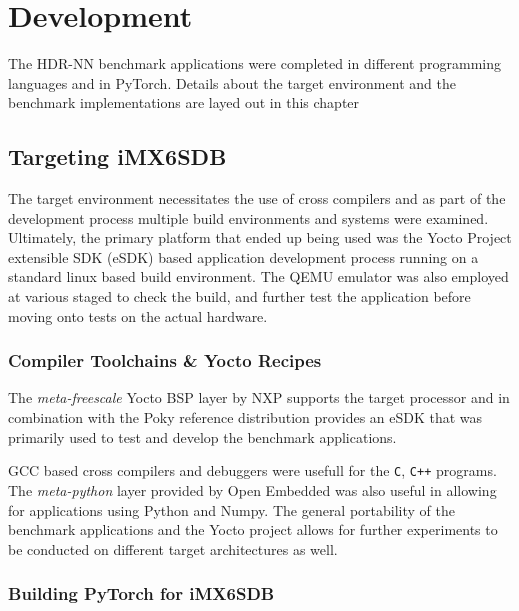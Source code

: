 
\chapter{Development}

The HDR-NN benchmark applications were completed in different programming languages and in PyTorch. Details about the target environment and the benchmark implementations are layed out in this chapter

\section[iMX6 Custom Board Target]{Targeting iMX6SDB}

The target environment necessitates the use of cross compilers and as part of the development process multiple build environments and systems were examined. Ultimately, the primary platform that ended up being used was the Yocto Project extensible SDK (eSDK) based application development process running on a standard linux based build environment. The QEMU emulator was also employed at various staged to check the build, and further test the application before moving onto tests on the actual hardware.

\subsection{Compiler Toolchains \& Yocto Recipes}

The \textit{meta-freescale} Yocto BSP layer by NXP supports the target processor and in combination with the Poky reference distribution provides an eSDK that was primarily used to test and develop the benchmark applications.

GCC based cross compilers and debuggers were usefull for the \texttt{C}, \texttt{C++}  programs. The \textit{meta-python} layer provided by Open Embedded was also useful in allowing for applications using Python and Numpy. The general portability of the benchmark applications and the Yocto project allows for further experiments to be conducted on different target architectures as well.

\subsection{Building PyTorch for iMX6SDB}

